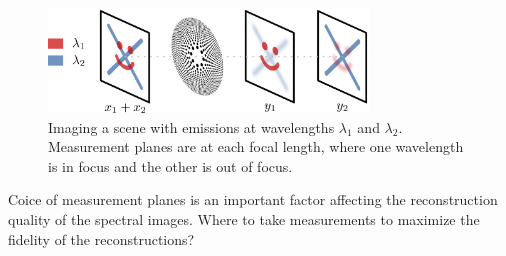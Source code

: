\documentclass{article}
\begin{document}
\begin{figure}[htb]

\begin{minipage}[b]{1\linewidth}
  \centering
  \centerline{\includegraphics[width=8.5cm]{drawing}}
\end{minipage}
\caption{Imaging a scene with emissions at wavelengths $\lambda_1$ and
$\lambda_2$. Measurement planes are at each focal length, where one wavelength
is in focus and the other is out of focus.}
\label{fig:pssi_drawing}
\end{figure}

Coice of measurement planes is an important factor affecting the reconstruction
quality of the spectral images. Where to take measurements to maximize the
fidelity of the reconstructions?



\end{document}
